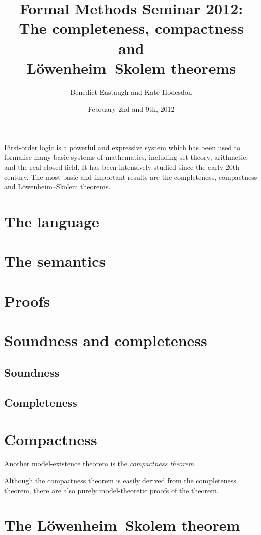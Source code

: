 \documentclass[10pt, a4paper, oneside]{article}
\title{Formal Methods Seminar 2012:\\
       The completeness, compactness and\\
       Löwenheim--Skolem theorems}
\author{Benedict Eastaugh and Kate Hodesdon}
\date{February 2nd and 9th, 2012}
\theoremstyle{definition}
\theoremstyle{remark}
\theoremstyle{plain}
\begin{document}
\maketitle

First-order logic is a powerful and expressive system which has been used to
formalise many basic systems of mathematics, including set theory, arithmetic,
and the real closed field. It has been intensively studied since the early 20th
century. The most basic and important results are the completeness, compactness
and Löwenheim--Skolem theorems.


\section{The language}


\section{The semantics}


\section{Proofs}


\section{Soundness and completeness}

\subsection{Soundness}

\subsection{Completeness}


\section{Compactness}

Another model-existence theorem is the \emph{compactness theorem}.


Although the compactness theorem is easily derived from the completeness
theorem, there are also purely model-theoretic proofs of the theorem.

\section{The Löwenheim--Skolem theorem}
\end{document}
